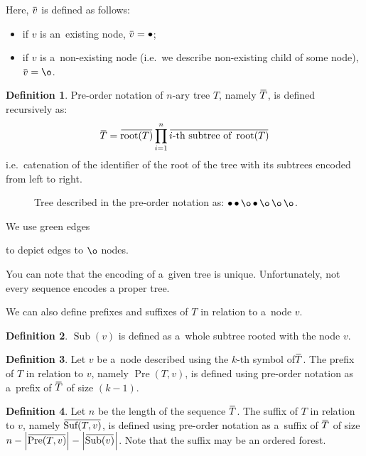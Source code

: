 \documentclass[final]{article}
\theoremstyle{definition}
\newtheorem{definition}{Definition}[subsection]
\theoremstyle{definition}
\theoremstyle{remark}
\newcommand{\ols}[1]{\mskip.5\thinmuskip\overline{\mskip-.5\thinmuskip {#1} \mskip-.5\thinmuskip}\mskip.5\thinmuskip} %
\newcommand{\enc}[1]{\ensuremath{\ols{#1}}}
\newcommand{\size}[1]{\ensuremath{\left|#1\right|}}
\DeclareMathOperator{\troot}{\text{root}}
\DeclareMathOperator{\tSub}{\text{Sub}}
\DeclareMathOperator{\tPre}{\text{Pre}}
\DeclareMathOperator{\tSuf}{\text{Suf}}
\DeclareMathOperator{\n}{\bullet}
\DeclareMathOperator{\no}{\o}
\begin{document}
Here, \(\enc{v}\) is defined as follows:
\begin{itemize}
    \item if \(v\) is an~existing node, \(\enc{v} = \n\);
    \item if \(v\) is a~non-existing node (i.e.~we describe non-existing child of some node), \(\enc{v} = \no\).
\end{itemize}

\begin{definition}
    Pre-order notation of \(n\)-ary tree \(T\), namely \(\enc{T}\), is defined recursively as:
    \[\enc{T} = \enc{\troot(T)} \prod_{i=1}^{n} \enc{i\text{-th subtree of } \troot(T)}\]
    i.e.~catenation of the identifier of the root of the tree with its subtrees encoded from left to right.
\end{definition}

\begin{figure}[H]
    \centering
    
    \caption{Tree described in the pre-order notation as: \(\n \n \no \n \no \no \no\).}%
    \label{fig:oononnn}
\end{figure}

We use green edges 
\begin{minipage}{1.5em}

\end{minipage}
to depict edges to \(\no\) nodes.

You can note that the encoding of a~given tree is unique. Unfortunately, not every sequence encodes a proper tree.

We can also define prefixes and suffixes of \(T\) in relation to a~node \(v\).

\begin{definition}
    \(\tSub(v)\) is defined as a~whole subtree rooted with the node \(v\).
\end{definition}

\begin{definition}
    Let \(v\) be a~node described using the \(k\)-th symbol of\;\(\enc{T}\). The prefix of \(T\) in relation to \(v\), namely \(\tPre(T, v)\), is defined using pre-order notation as a~prefix of \enc{T} of size \((k - 1)\).
\end{definition}

\begin{definition}
    Let \(n\) be the length of the sequence \(\enc{T}\). The suffix of \(T\) in relation to \(v\), namely \(\enc{\tSuf(T, v)}\), is defined using pre-order notation as a~suffix of \enc{T} of size \(n - \size{\enc{\tPre(T, v)}} - \size{\enc{\tSub(v)}}\). Note that the suffix may be an ordered forest.
\end{definition}
\end{document}
